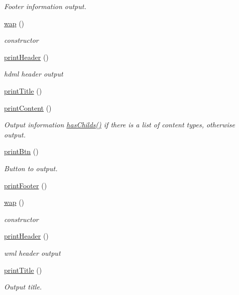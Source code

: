 \begin{DoxyCompactItemize}
\begin{DoxyCompactList}\small\item\em Footer information output. \end{DoxyCompactList}\item 
\hyperlink{classwap_a7b4befeef8257c63a0ffe3012a84560b}{wap} ()
\begin{DoxyCompactList}\small\item\em constructor \end{DoxyCompactList}\item 
\hyperlink{classwap_a402c6a180ae759c7a173a67441dfb716}{print\+Header} ()
\begin{DoxyCompactList}\small\item\em hdml header output \end{DoxyCompactList}\item 
\hyperlink{classwap_a048fa1324853c9d69e795c7d34f7ad8b}{print\+Title} ()
\item 
\hyperlink{classwap_a1edebe2b6a90ec08ab149ad2b2866dbd}{print\+Content} ()
\begin{DoxyCompactList}\small\item\em Output information \hyperlink{classmobileXE_a680f6a6b774bf12be4c67b6a9215f1ea}{has\+Childs()} if there is a list of content types, otherwise output. \end{DoxyCompactList}\item 
\hyperlink{classwap_a47437aad53e77ce53aebb4db6240cc38}{print\+Btn} ()
\begin{DoxyCompactList}\small\item\em Button to output. \end{DoxyCompactList}\item 
\hyperlink{classwap_a1fd1c1dca866c9b6653499cabf124980}{print\+Footer} ()
\item 
\hyperlink{classwap_a7b4befeef8257c63a0ffe3012a84560b}{wap} ()
\begin{DoxyCompactList}\small\item\em constructor \end{DoxyCompactList}\item 
\hyperlink{classwap_a402c6a180ae759c7a173a67441dfb716}{print\+Header} ()
\begin{DoxyCompactList}\small\item\em wml header output \end{DoxyCompactList}\item 
\hyperlink{classwap_a048fa1324853c9d69e795c7d34f7ad8b}{print\+Title} ()
\begin{DoxyCompactList}\small\item\em Output title. \end{DoxyCompactList}\item 

\end{DoxyCompactItemize}

